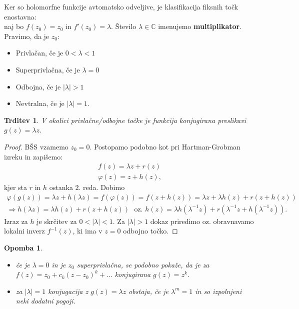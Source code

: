 \documentclass{article}
\newtheorem{trditev}{Trditev}
\newtheorem{opomba}{Opomba}
\newcommand{\C}{\mathbb{C}}
\begin{document}
Ker so holomorfne funkcije avtomatsko odveljive, je klasifikacija
fiksnih točk enostavna: \\
naj bo $f(z_0) = z_0$ in $f'(z_0) = \lambda$. Število $\lambda \in \C$
imenujemo \textbf{multiplikator}.
Pravimo, da je $z_0$:
\begin{itemize}
    \item Privlačan, če je $0 < \lambda < 1$
    \item Superprivlačna, če je $\lambda = 0$
    \item Odbojna, če je $|\lambda| > 1$ 
    \item Nevtralna, če je $|\lambda| = 1$.
\end{itemize}

\begin{trditev}
V okolici privlačne\slash odbojne točke je funkcija konjugirana 
preslikavi $g(z) = \lambda z$.
\end{trditev}

\begin{proof}
BŠS vzamemo $z_0 = 0$. Postopamo podobno kot pri Hartman-Grobman izreku in 
zapišemo:
\begin{align*}
f(z) = \lambda z + r(z) \\
\varphi(z) = z + h(z),
\end{align*}
kjer sta $r$ in $h$ ostanka $2$. reda. Dobimo 
\begin{align*}
\varphi(g(z)) = \lambda z + h(\lambda z) = f(\varphi(z)) = f(z + h(z)) = \lambda z + \lambda h(z) + r(z + h(z))\\
\Longrightarrow h(\lambda z) = \lambda h(z) + r(z + h(z)) \,\, \text{ oz. } h(z) = \lambda h(\lambda^{-1} z) + r(\lambda^{-1} z + h(\lambda^{-1} z)).
\end{align*}
Izraz za $h$ je skrčitev za $0 < |\lambda| < 1$. Za $|\lambda| > 1$ 
dokaz priredimo oz. obravnavamo lokalni inverz $f^{-1}(z)$, ki ima 
v $z = 0$ odbojno točko.
\end{proof}

\begin{opomba}
\hfill
\begin{itemize}
    \item če je $\lambda = 0$ in je $z_0$ superprivlačna, se podobno pokaže, 
    da je za $f(z) = z_0 + c_k(z - z_0)^k + \dots$ konjugirana $g(z) = z^k$.
    \item za $|\lambda| = 1$ konjugacija z $g(z) = \lambda z$ obstaja, če je 
    $\lambda^m = 1$ in so izpolnjeni neki dodatni pogoji.
\end{itemize}
\end{opomba}
\end{document}
